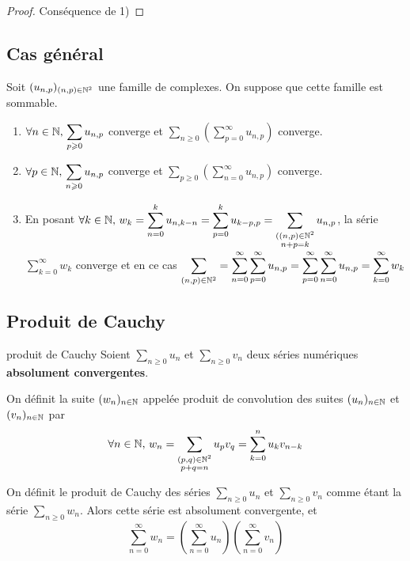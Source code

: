 \begin{proof}
    Conséquence de 1)
\end{proof}

\subsection{Cas général}

\begin{theoreme}{}{}
    Soit $(u_{n, p})_{(n, p) \in \mathbb{N}^2}$ une famille de complexes. On suppose que 
    cette famille est sommable.

    \begin{enumerate}
        \item $\displaystyle \forall n \in \mathbb{N}, \, \sum_{p \geqslant 0 } u_{n, p}$ converge et $\displaystyle \sum_{n \geqslant 0} \left( \sum_{p = 0}^\infty u_{n, p} \right)$ converge.
        \item $\forall p \in \mathbb{N}, \, \displaystyle \sum_{n \geqslant 0 } u_{n, p}$ converge et $\displaystyle \sum_{p \geqslant 0} \left( \sum_{n = 0}^\infty u_{n, p} \right)$ converge.
        \item En posant $\forall k \in \mathbb{N}, \, w_k = \displaystyle \sum_{n = 0 }^{k }u_{n, k - n} = \sum_{p = 0 }^{k } u_{k - p, p} = \sum_{\substack{((n, p) \in \mathbb{N}^2 \\ n + p = k}} u_{n, p}$, la série $\displaystyle \sum_{k = 0}^\infty w_k$ converge
            et en ce cas $\displaystyle \sum_{(n, p) \in \mathbb{N}^2} = \sum_{n = 0 }^{\infty } \sum_{p = 0 }^{\infty }u_{n, p} = \sum_{p = 0 }^{\infty } \sum_{n = 0 }^{\infty }u_{n, p} = \sum_{k = 0 }^{\infty } w_k$ 
    \end{enumerate}
\end{theoreme}

\subsection{Produit de Cauchy }

\begin{theoreme}{produit de Cauchy}{}
    Soient $ \sum_{n \geqslant 0} u_n$ et $ \sum_{n \geqslant 0} v_n$ deux séries 
    numériques \textbf{absolument convergentes}.
    
    On définit la suite $(w_n)_{n \in \mathbb{N}}$ appelée produit de convolution des suites 
    $(u_n)_{n \in \mathbb{N}}$ et $(v_n)_{n \in \mathbb{N}}$ par
    $$\forall n \in \mathbb{N}, \, w_n = \sum_{\substack{(p, q) \in \mathbb{N}^2 \\ p + q = n}} u_p v_q = \sum_{k = 0}^n u_k v_{n - k}$$

    On définit le produit de Cauchy des séries $ \sum_{n \geqslant 0} u_n$ et $ \sum_{n \geqslant 0} v_n$ 
    comme étant la série $ \sum_{n \geqslant 0} w_n$. Alors cette série est
    absolument convergente, et $$\sum_{n = 0 }^{\infty} w_n = \left( \sum_{n = 0 }^{\infty } u_n \right) \left( \sum_{n = 0 }^{\infty } v_n \right)$$
\end{theoreme}

